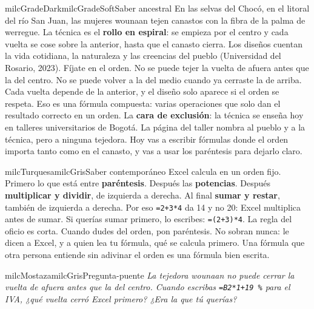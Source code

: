 \documentclass[11pt,letterpaper]{article}
\begin{document}
\begin{softbox}{milcGradeDark}{milcGradeSoft}{Saber ancestral}
En las selvas del Chocó, en el litoral del río San Juan, las mujeres wounaan tejen canastos con la fibra de la palma de werregue. La técnica es el \textbf{rollo en espiral}: se empieza por el centro y cada vuelta se cose sobre la anterior, hasta que el canasto cierra. Los diseños cuentan la vida cotidiana, la naturaleza y las creencias del pueblo (Universidad del Rosario, 2023). Fíjate en el orden. No se puede tejer la vuelta de afuera antes que la del centro. No se puede volver a la del medio cuando ya cerraste la de arriba. Cada vuelta depende de la anterior, y el diseño solo aparece si el orden se respeta. Eso es una fórmula compuesta: varias operaciones que solo dan el resultado correcto en un orden. La \textbf{cara de exclusión}: la técnica se enseña hoy en talleres universitarios de Bogotá. La página del taller nombra al pueblo y a la técnica, pero a ninguna tejedora. Hoy vas a escribir fórmulas donde el orden importa tanto como en el canasto, y vas a usar los paréntesis para dejarlo claro.\par{}
\end{softbox}

\begin{softbox}{milcTurquesa}{milcGris}{Saber contemporáneo}
Excel calcula en un orden fijo. Primero lo que está entre \textbf{paréntesis}. Después las \textbf{potencias}. Después \textbf{multiplicar y dividir}, de izquierda a derecha. Al final \textbf{sumar y restar}, también de izquierda a derecha. Por eso \texttt{=2+3*4} da 14 y no 20: Excel multiplica antes de sumar. Si querías sumar primero, lo escribes: \texttt{=(2+3)*4}. La regla del oficio es corta. Cuando dudes del orden, pon paréntesis. No sobran nunca: le dicen a Excel, y a quien lea tu fórmula, qué se calcula primero. Una fórmula que otra persona entiende sin adivinar el orden es una fórmula bien escrita.
\end{softbox}

\begin{softbox}{milcMostaza}{milcGris}{Pregunta-puente}
\textit{La tejedora wounaan no puede cerrar la vuelta de afuera antes que la del centro. Cuando escribas \texttt{=B2*1+19~\%} para el IVA, ¿qué vuelta cerró Excel primero? ¿Era la que tú querías?}
\end{softbox}
\end{document}
